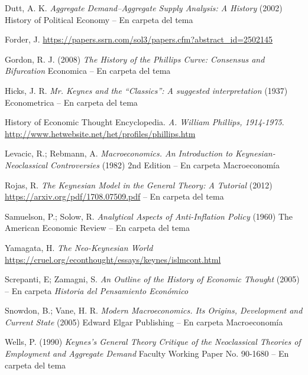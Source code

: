 \documentclass{nuevotema}
\begin{document}
Dutt, A. K. \textit{Aggregate Demand–Aggregate Supply Analysis: A History} (2002) History of Political Economy -- En carpeta del tema

Forder, J.  \url{https://papers.ssrn.com/sol3/papers.cfm?abstract_id=2502145}

Gordon, R. J. (2008) \textit{The History of the Phillips Curve: Consensus and Bifurcation} Economica -- En carpeta del tema

Hicks, J. R. \textit{Mr. Keynes and the ``Classics'': A suggested interpretation} (1937) Econometrica -- En carpeta del tema

History of Economic Thought Encyclopedia. \textit{A. William Phillips, 1914-1975}. \url{http://www.hetwebsite.net/het/profiles/phillips.htm}

Levacic, R.; Rebmann, A. \textit{Macroeconomics. An Introduction to Keynesian-Neoclassical Controversies} (1982) 2nd Edition -- En carpeta Macroeconomía

Rojas, R. \textit{The Keynesian Model in the General Theory: A Tutorial} (2012) \url{https://arxiv.org/pdf/1708.07509.pdf} -- En carpeta del tema

Samuelson, P.; Solow, R. \textit{Analytical Aspects of Anti-Inflation Policy} (1960) The American Economic Review -- En carpeta del tema

Yamagata, H. \textit{The Neo-Keynesian World} \url{https://cruel.org/econthought/essays/keynes/islmcont.html}

Screpanti, E; Zamagni, S. \textit{An Outline of the History of Economic Thought} (2005) -- En carpeta \textit{Historia del Pensamiento Económico}

Snowdon, B.; Vane, H. R. \textit{Modern Macroeconomics. Its Origins, Development and Current State} (2005) Edward Elgar Publishing --  En carpeta Macroeconomía

Wells, P. (1990) \textit{Keynes's General Theory Critique of the Neoclassical Theories of Employment and Aggregate Demand} Faculty Working Paper No. 90-1680 -- En carpeta del tema
\end{document}
